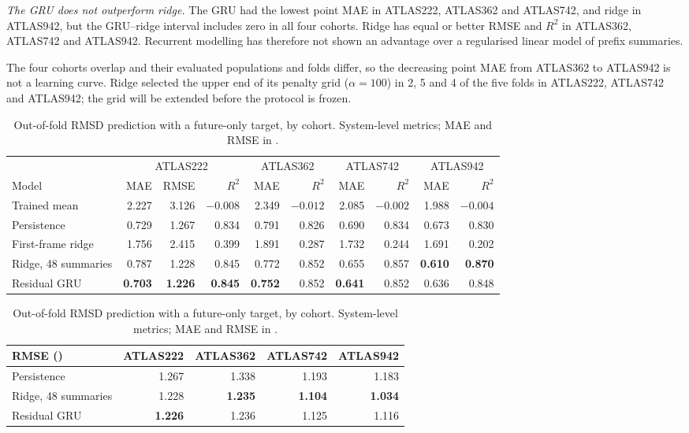 \documentclass[11pt]{article}
\newcommand{\A}{\text{\AA}}
\begin{document}
\emph{The GRU does not outperform ridge.} The GRU had the lowest point MAE in ATLAS222, ATLAS362 and ATLAS742, and ridge in ATLAS942, but the GRU--ridge interval includes zero in all four cohorts. Ridge has equal or better RMSE and $R^2$ in ATLAS362, ATLAS742 and ATLAS942. Recurrent modelling has therefore not shown an advantage over a regularised linear model of prefix summaries.

The four cohorts overlap and their evaluated populations and folds differ, so the decreasing point MAE from ATLAS362 to ATLAS942 is not a learning curve. Ridge selected the upper end of its penalty grid ($\alpha=100$) in 2, 5 and 4 of the five folds in ATLAS222, ATLAS742 and ATLAS942; the grid will be extended before the protocol is frozen.

\begin{table}[ht]
\centering
\small
\caption{Out-of-fold RMSD prediction with a future-only target, by cohort. System-level metrics; MAE and RMSE in \A.}
\label{tab:scaled}
\footnotesize
\setlength{\tabcolsep}{4pt}
\begin{tabular}{lrrrrrrrrr}
\toprule
 & \multicolumn{3}{c}{ATLAS222} & \multicolumn{2}{c}{ATLAS362} & \multicolumn{2}{c}{ATLAS742} & \multicolumn{2}{c}{ATLAS942}\\
\cmidrule(lr){2-4}\cmidrule(lr){5-6}\cmidrule(lr){7-8}\cmidrule(lr){9-10}
Model & MAE & RMSE & $R^2$ & MAE & $R^2$ & MAE & $R^2$ & MAE & $R^2$ \\
\midrule
Trained mean          & 2.227 & 3.126 & $-0.008$ & 2.349 & $-0.012$ & 2.085 & $-0.002$ & 1.988 & $-0.004$ \\
Persistence           & 0.729 & 1.267 & 0.834 & 0.791 & 0.826 & 0.690 & 0.834 & 0.673 & 0.830 \\
First-frame ridge     & 1.756 & 2.415 & 0.399 & 1.891 & 0.287 & 1.732 & 0.244 & 1.691 & 0.202 \\
Ridge, 48 summaries   & 0.787 & 1.228 & 0.845 & 0.772 & 0.852 & 0.655 & 0.857 & \textbf{0.610} & \textbf{0.870} \\
Residual GRU          & \textbf{0.703} & \textbf{1.226} & \textbf{0.845} & \textbf{0.752} & 0.852 & \textbf{0.641} & 0.852 & 0.636 & 0.848 \\
\bottomrule
\end{tabular}

\vspace{1ex}
\begin{tabular}{lrrrr}
\toprule
RMSE (\A) & ATLAS222 & ATLAS362 & ATLAS742 & ATLAS942 \\
\midrule
Persistence & 1.267 & 1.338 & 1.193 & 1.183 \\
Ridge, 48 summaries & 1.228 & \textbf{1.235} & \textbf{1.104} & \textbf{1.034} \\
Residual GRU & \textbf{1.226} & 1.236 & 1.125 & 1.116 \\
\bottomrule
\end{tabular}
\end{table}
\end{document}
